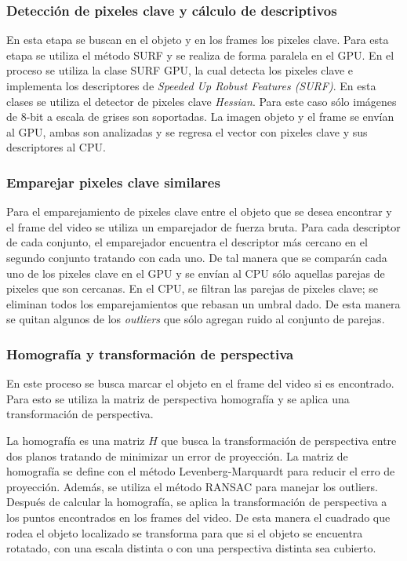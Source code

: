 \documentclass[a4paper]{article}
\begin{document}
\subsubsection{Detección de pixeles clave y cálculo de descriptivos}
\label{sec2}
En esta etapa se buscan en el objeto y en los frames los pixeles clave. Para esta etapa se utiliza el método SURF y se realiza de forma paralela en el GPU. En el proceso se utiliza la clase SURF GPU, la cual detecta los pixeles clave e implementa los descriptores de \emph{Speeded Up Robust Features (SURF)}. En esta clases se utiliza el detector de pixeles clave \emph{Hessian}. Para este caso sólo imágenes de 8-bit a escala de grises son soportadas. La imagen objeto y el frame se envían al GPU, ambas son analizadas y se regresa el vector con pixeles clave y sus descriptores al CPU.

\subsubsection{Emparejar pixeles clave similares}
\label{sec4}
Para el emparejamiento de pixeles clave entre el objeto que se desea encontrar y el frame del video se utiliza un emparejador de fuerza bruta. Para cada descriptor de cada conjunto, el emparejador encuentra el descriptor más cercano en el segundo conjunto tratando con cada uno. De tal manera que se comparán cada uno de los pixeles clave en el GPU y se envían al CPU sólo aquellas parejas de pixeles que son cercanas. En el CPU, se filtran las parejas de pixeles clave; se eliminan todos los emparejamientos que rebasan un umbral dado. De esta manera se quitan algunos de los \emph{outliers} que sólo agregan ruido al conjunto de parejas.

\subsubsection{Homografía y transformación de perspectiva}
\label{sec5}
En este proceso se busca marcar el objeto en el frame del video si es encontrado. Para esto se utiliza la matriz de perspectiva homografía y se aplica una transformación de perspectiva.

La homografía es una matriz $H$ que busca la transformación de perspectiva entre dos planos tratando de minimizar un error de proyección. La matriz de homografía se define con el método Levenberg-Marquardt para reducir el erro de proyección. Además, se utiliza el método RANSAC para manejar los outliers. Después de calcular la homografía, se aplica la transformación de perspectiva a los puntos encontrados en los frames del video. De esta manera el cuadrado que rodea el objeto localizado se transforma para que si el objeto se encuentra rotatado, con una escala distinta o con una perspectiva distinta sea cubierto.
\end{document}
